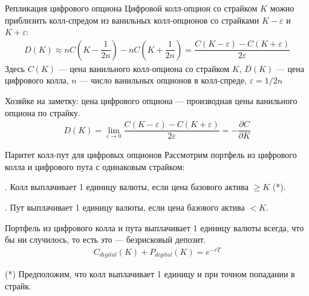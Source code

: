 \documentclass{beamer}
\newcommand{\en}[1]{\begin{otherlanguage}{english}#1\end{otherlanguage}}
\begin{document}
\begin{frame}{Репликация цифрового опциона}
\justify
Цифровой колл-опцион со страйком $K$ можно приблизить колл-спредом из ванильных
колл-опционов со страйками $K-\varepsilon$ и $K+\varepsilon$:
\begin{align*}
D(K) \approx nC\left(K - \dfrac{1}{2n}\right) - nC\left(K + \dfrac{1}{2n}\right) = \dfrac{C(K-\varepsilon) - C(K+\varepsilon)}{2\varepsilon}
\end{align*}
Здесь $C(K)$ --- цена ванильного колл-опциона со страйком $K$, $D(K)$ --- цена 
цифрового колла, $n$ --- число ванильных опционов в колл-спреде, $\varepsilon=1/2n$

\justify
Хозяйке на заметку: цена цифрового опциона --- производная цены ванильного опциона по 
страйку.
\begin{align*}
D(K) = \lim\limits_{\varepsilon\to 0}\dfrac{C(K-\varepsilon) - C(K+\varepsilon)}{2\varepsilon} = -\dfrac{\partial C}{\partial K}
\end{align*}
\end{frame}



\begin{frame}{Паритет колл-пут для цифровых опционов}
\justify
Рассмотрим портфель из цифрового колла и цифрового пута с одинаковым страйком:

. Колл выплачивает 1 единицу валюты, если цена базового актива $\ge K$ (*).

. Пут выплачивает 1 единицу валюты, если цена базового актива $< K$.

\justify
Портфель из цифрового колла и пута выплачивает 1 единицу валюты всегда, что бы ни 
случилось, то есть это --- безрисковый депозит.
\begin{align*}
C_{digital}(K) + P_{digital}(K) = e^{-rT}
\end{align*}

\justify
(*) Предположим, что колл выплачивает 1 единицу и при точном попадании в страйк.
\end{frame}



\end{document}

